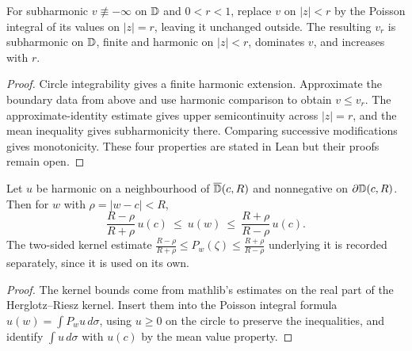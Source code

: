 \begin{theorem}
  \label{thm:I_6_5}
  \leanok
  For subharmonic $v\not\equiv-\infty$ on $\mathbb{D}$ and $0<r<1$, replace $v$ on $|z|<r$
  by the Poisson integral of its values on $|z|=r$, leaving it unchanged
  outside. The resulting $v_r$ is subharmonic on $\mathbb{D}$, finite and harmonic
  on $|z|<r$, dominates $v$, and increases with $r$.
  \begin{proof}
    \notready
    Circle integrability gives a finite harmonic extension. Approximate the
    boundary data from above and use harmonic comparison to obtain $v\le v_r$.
    The approximate-identity estimate gives upper semicontinuity across
    $|z|=r$, and the mean inequality gives subharmonicity there. Comparing
    successive modifications gives monotonicity. These four properties
    are stated in Lean but their proofs remain open.
  \end{proof}
\end{theorem}

\begin{lemma}
  \label{lem:harnack_inequality}
  \leanok
  Let $u$ be harmonic on a neighbourhood of $\overline{\mathbb{D}}(c,R)$ and nonnegative
  on $\partial\mathbb{D}(c,R)$. Then for $w$ with $\rho=|w-c|<R$,
  \[
    \frac{R-\rho}{R+\rho}\,u(c)\ \le\ u(w)\ \le\ \frac{R+\rho}{R-\rho}\,u(c).
  \]
  The two-sided kernel estimate
  $\frac{R-\rho}{R+\rho}\le P_w(\zeta)\le\frac{R+\rho}{R-\rho}$ underlying it is
  recorded separately, since it is used on its own.
  \begin{proof}
    \leanok
    The kernel bounds come from mathlib's estimates on the real part of the
    Herglotz--Riesz kernel. Insert them into the Poisson integral formula
    $u(w)=\int P_w u\,d\sigma$, using $u\ge0$ on the circle to preserve the
    inequalities, and identify $\int u\,d\sigma$ with $u(c)$ by the mean value
    property.
  \end{proof}
\end{lemma}

